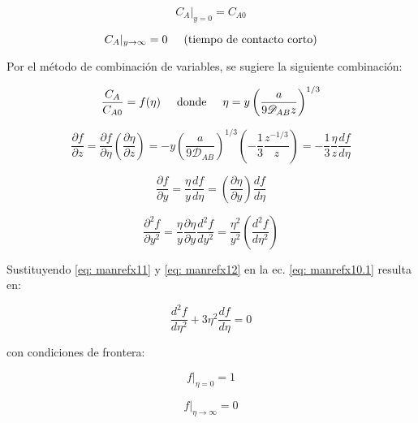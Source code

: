 \begin{equation}
	C_A|_{y=0} = C_{A0}
\end{equation}

\begin{equation}
	C_A|_{y \to \infty} = 0 \hspace{0.5cm} \text{(tiempo de contacto corto)}
\end{equation}

Por el método de combinación de variables, se sugiere la siguiente combinación:

\begin{equation} \label{eq: manrefx11}
	\frac{C_A}{C_{A0}} = f(\eta) \hspace{0.5cm} \text{donde} \hspace{0.5cm} \eta = y \left( \frac{a}{9 \mathscr{D}_{AB}z} \right)^{1/3}
\end{equation}

\begin{equation}
	\frac{\partial f}{\partial z} = \frac{\partial f}{\partial \eta} \left( \frac{\partial \eta}{\partial z} \right) = - y \left( \frac{a}{9 \mathscr{D}_{AB}} \right)^{1/3} \left( - \frac{1}{3} \frac{z^{-1/3}}{z} \right) = - \frac{1}{3} \frac{\eta}{z} \frac{d f}{d \eta}
\end{equation}

$$
\frac{\partial f}{\partial y} = \frac{\eta}{y} \frac{df}{d\eta} = \left( \frac{\partial \eta}{\partial y} \right) \frac{d f}{d \eta}
$$

\begin{equation} \label{eq: manrefx12}
	\frac{\partial^2 f}{\partial y^2} = \frac{\eta}{y} \frac{\partial \eta}{\partial y} \frac{d^2 f}{d y^2} = \frac{\eta^2}{y^2} \left( \frac{d^2 f}{d \eta^2} \right)
\end{equation}

Sustituyendo \eqref{eq: manrefx11} y \eqref{eq: manrefx12} en la ec. \eqref{eq: manrefx10.1} resulta en:

\begin{equation} \label{eq: manrefx13}
	\frac{d^2 f}{d \eta^2} + 3 \eta^2 \frac{df}{d \eta} = 0
\end{equation}

con condiciones de frontera:

\begin{equation} \label{eq: manrefx14}
	f|_{\eta = 0} = 1
\end{equation}

\begin{equation} \label{eq: manrefx15}
	f|_{\eta \to \infty} = 0
\end{equation}

